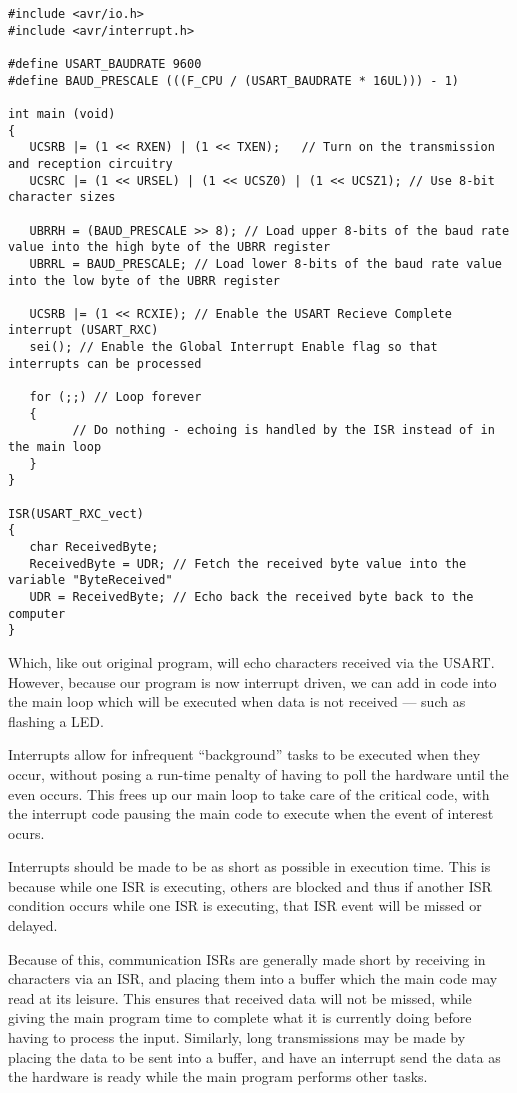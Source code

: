 \documentclass[a4paper,oneside,notitlepage]{book}
\begin{document}
\begin{center}
\begin{lstlisting}
#include <avr/io.h>
#include <avr/interrupt.h>

#define USART_BAUDRATE 9600
#define BAUD_PRESCALE (((F_CPU / (USART_BAUDRATE * 16UL))) - 1)

int main (void)
{
   UCSRB |= (1 << RXEN) | (1 << TXEN);   // Turn on the transmission and reception circuitry
   UCSRC |= (1 << URSEL) | (1 << UCSZ0) | (1 << UCSZ1); // Use 8-bit character sizes

   UBRRH = (BAUD_PRESCALE >> 8); // Load upper 8-bits of the baud rate value into the high byte of the UBRR register
   UBRRL = BAUD_PRESCALE; // Load lower 8-bits of the baud rate value into the low byte of the UBRR register

   UCSRB |= (1 << RCXIE); // Enable the USART Recieve Complete interrupt (USART_RXC)
   sei(); // Enable the Global Interrupt Enable flag so that interrupts can be processed

   for (;;) // Loop forever
   {
         // Do nothing - echoing is handled by the ISR instead of in the main loop
   }   
}

ISR(USART_RXC_vect)
{
   char ReceivedByte;
   ReceivedByte = UDR; // Fetch the received byte value into the variable "ByteReceived"
   UDR = ReceivedByte; // Echo back the received byte back to the computer
}
\end{lstlisting}
\end{center}

Which, like out original program, will echo characters received via the USART. However, because our program is now interrupt driven, we can add in code into the main loop which will be executed when data is not received --- such as flashing a LED.

Interrupts allow for infrequent ``background'' tasks to be executed when they occur, without posing a run-time penalty of having to poll the hardware until the even occurs. This frees up our main loop to take care of the critical code, with the interrupt code pausing the main code to execute when the event of interest ocurs.

Interrupts should be made to be as short as possible in execution time. This is because while one ISR is executing, others are blocked and thus if another ISR condition occurs while one ISR is executing, that ISR event will be missed or delayed.

Because of this, communication ISRs are generally made short by receiving in characters via an ISR, and placing them into a buffer which the main code may read at its leisure. This ensures that received data will not be missed, while giving the main program time to complete what it is currently doing before having to process the input. Similarly, long transmissions may be made by placing the data to be sent into a buffer, and have an interrupt send the data as the hardware is ready while the main program performs other tasks. 
\end{document}
